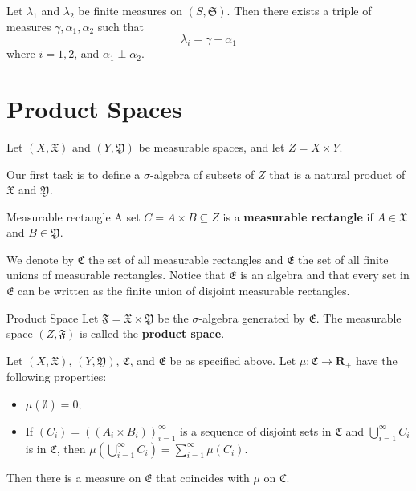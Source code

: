 \begin{lemma}[]{}{}
	Let $\lambda_1$ and $\lambda_2$ be finite measures on $(S, \mathfrak{S})$. Then there exists a triple of measures $\gamma, \alpha_1, \alpha_2$ such that
	\[
		\lambda_i = \gamma + \alpha_1
	\]
	where $i = 1, 2$, and $\alpha_1 \perp \alpha_2$.
\end{lemma}

\section{Product Spaces}

Let $(X, \mathfrak{X})$ and $(Y, \mathfrak{Y})$ be measurable spaces, and let $Z = X \times Y$.

Our first task is to define a $\sigma$-algebra of subsets of $Z$ that is a natural product of $\mathfrak{X}$ and $\mathfrak{Y}$.

\begin{definition}[]{Measurable rectangle}
	A set $C = A \times B \subseteq Z$ is a \textbf{measurable rectangle} if $A \in \mathfrak{X}$ and $B \in \mathfrak{Y}$.
\end{definition}

We denote by $\mathfrak{C}$ the set of all measurable rectangles and $\mathfrak{E}$ the set of all finite unions of measurable rectangles. Notice that $\mathfrak{E}$ is an algebra and that every set in $\mathfrak{E}$ can be written as the finite union of disjoint measurable rectangles.

\begin{definition}[]{Product Space}{}
	Let $\mathfrak{F} = \mathfrak{X} \times \mathfrak{Y}$ be the $\sigma$-algebra generated by $\mathfrak{E}$. The measurable space $(Z, \mathfrak{F})$ is called the \textbf{product space}.
\end{definition}

\begin{theorem}[]{}{}
	Let $(X, \mathfrak{X})$, $(Y, \mathfrak{Y})$, $\mathfrak{C}$, and $\mathfrak{E}$ be as specified above. Let $\mu : \mathfrak{C} \longrightarrow \textbf{R}_+$ have the following properties:
	\begin{itemize}
		\item $\mu(\emptyset) = 0$;
  		\item  If $(C_i) = ((A_i \times B_i))_{i=1}^\infty$ is a sequence of disjoint sets in $\mathfrak{C}$ and $\bigcup_{i=1}^\infty C_i$ is in $\mathfrak{C}$, then $\mu \left( \bigcup_{i=1}^\infty C_i \right) = \sum_{i=1}^\infty \mu(C_i)$.
	\end{itemize}
	Then there is a measure on $\mathfrak{E}$ that coincides with $\mu$ on $\mathfrak{C}$.
\end{theorem}


